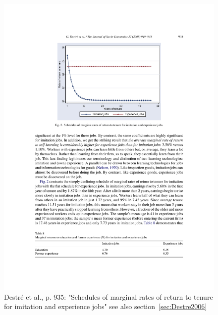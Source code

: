 \documentclass[12pt,a4paper]{article}
\begin{document}
    \begin{figure}[htb]
      \centering
      \includegraphics[width=12cm]{Meeting 4 LEARNING FROM EXPERIENCE - Seite 935.pdf}
      \caption{Destré et al., p. 935: "Schedules of marginal rates of return to tenure for imitation and experience jobs" see also section~\ref{sec:Destre2006}}
      \label{fig:Destré marginalreturntotenure}
    \end{figure}
\end{document}
